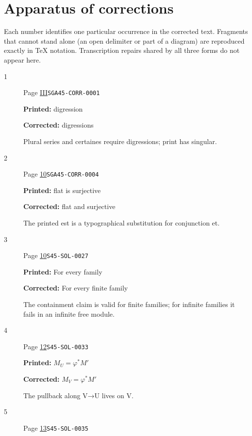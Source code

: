 \ifnum{}\relax
\clearpage
\chapter*{Apparatus of corrections}
Each number identifies one particular occurrence in the corrected text. Fragments that cannot stand alone (an open delimiter or part of a diagram) are reproduced exactly in TeX notation. Transcription repairs shared by all three forms do not appear here.
\begingroup\small
\begin{description}
\item[\hypertarget{apparatus:EN-0001}{1}] Page \hyperlink{printpage:en:III}{III}\quad\texttt{SGA45-CORR-0001}
\par\noindent\textbf{Printed:} digression
\par\noindent\textbf{Corrected:} digressions
\par\noindent Plural series and certaines require digressions; print has singular.
\smallskip
\item[\hypertarget{apparatus:EN-0002}{2}] Page \hyperlink{printpage:en:10}{10}\quad\texttt{SGA45-CORR-0004}
\par\noindent\textbf{Printed:} flat is surjective
\par\noindent\textbf{Corrected:} flat and surjective
\par\noindent The printed est is a typographical substitution for conjunction et.
\smallskip
\item[\hypertarget{apparatus:EN-0003}{3}] Page \hyperlink{printpage:en:10}{10}\quad\texttt{S45-SOL-0027}
\par\noindent\textbf{Printed:} For every family
\par\noindent\textbf{Corrected:} For every finite family
\par\noindent The containment claim is valid for finite families; for infinite families it fails in an infinite free module.
\smallskip
\item[\hypertarget{apparatus:EN-0004}{4}] Page \hyperlink{printpage:en:12}{12}\quad\texttt{S45-SOL-0033}
\par\noindent\textbf{Printed:} \(M_U=\varphi^*M'\)
\par\noindent\textbf{Corrected:} \(M_V=\varphi^*M'\)
\par\noindent The pullback along V→U lives on V.
\smallskip
\item[\hypertarget{apparatus:EN-0005}{5}] Page \hyperlink{printpage:en:13}{13}\quad\texttt{S45-SOL-0035}

\end{description}
